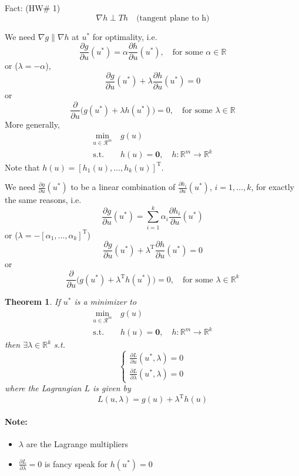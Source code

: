 \documentclass[letterpaper,12pt,titlepage]{report}
\newcommand{\trans}{^\text{T}}
\newcommand*\pder[2]{\frac{\partial #1}{\partial #2}}
\newcommand*\R{\mathbb{R}}
\theoremstyle{plain}
\newtheorem*{thm}{Theorem}
\theoremstyle{definition}
\begin{document}
\medskip
Fact: (HW\# 1)
\[ \nabla h \perp Th \quad \text{(tangent plane to h)} \]
\begin{center}
\end{center}
We need $\nabla g \parallel \nabla h$ at $u^*$ for optimality, i.e.
\[ \pder{g}{u}(u^*) = \alpha \pder{h}{u}(u^*), \quad \text{for some } \alpha\in\R \]
or ($\lambda=-\alpha$),
\[ \pder{g}{u}(u^*) + \lambda \pder{h}{u}(u^*) = 0 \]
or
\[ \pder{}{u} \big( g(u^*) + \lambda h(u^*) \big) = 0, \quad \text{for some } \lambda\in\R \]
More generally,
\begin{align}
  \min_{u\in\mathcal R^m} {}\ & g(u) \\
  \text{s.t. } & h(u)=\bm 0, \quad h:\R^m\to\R^k
\end{align}
Note that $h(u)=[h_1(u),\dots,h_k(u)]\trans$.

We need $\pder{g}{u}(u^*)$ to be a linear combination of $\pder{h_i}{u}(u^*)$, $i=1,\dots,k$, for exactly the same reasons, i.e.
\[ \pder{g}{u}(u^*) = \sum_{i=1}^k \alpha_i \pder{h_i}{u}(u^*) \]
or ($\lambda=-[\alpha_1,\dots,\alpha_k]\trans$)
\[ \pder{g}{u}(u^*) + \lambda\trans \pder{h}{u}(u^*) = 0 \]
or
\[ \pder{}{u} \big( g(u^*) + \lambda\trans h(u^*) \big) = 0, \quad \text{for some } \lambda\in\R^k \]

\begin{thm}
  If $u^*$ is a minimizer to 
  \begin{align}
    \min_{u\in\mathcal R^m} {}\ & g(u) \\
    \text{s.t. } & h(u)=\bm 0, \quad h:\R^m\to\R^k
  \end{align}
  then $\exists\lambda\in\R^k$ s.t.
  \[ \begin{cases}
    \displaystyle \pder{L}{u}(u^*,\lambda) = 0 \\[2ex]
    \displaystyle \pder{L}{\lambda}(u^*,\lambda) = 0
  \end{cases} \]
  where the Lagrangian $L$ is given by
  \[ L(u,\lambda) = g(u) + \lambda\trans h(u) \]
\end{thm}

\paragraph{Note:}
\begin{itemize}
\item $\lambda$ are the Lagrange multipliers
\item $\pder{L}{\lambda}=0$ is fancy speak for $h(u^*)=0$
\end{itemize}
\end{document}
